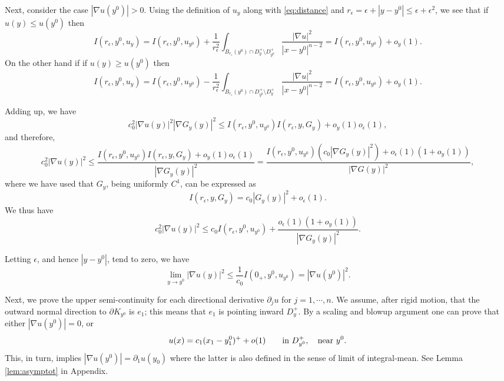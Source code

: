 \documentclass[11pt,reqno]{amsart}
\theoremstyle{plain}
\theoremstyle{remark}
\numberwithin{equation}{section}
\begin{document}
Next, consider the case \( |\nabla u(y^0)| > 0 \).
Using the definition of $u_y$ along with  \eqref{eq:distance} and  $r_\epsilon = \epsilon + |y-y^0| \leq  \epsilon + \epsilon^2$, we see that  
if $u(y) \leq u(y^0)$ then 
$$
I(r_\epsilon,y^0,u_{y}) = 
 I(r_\epsilon,y^0,u_{y^0}) + \frac{1}{r_\epsilon^2 }\int_{B_{r_\epsilon} (y^0) \cap D_{y}^+  \setminus D_{y^0}^+ }  \frac{|\nabla u|^2}{|x-y^0|^{n-2}} =  I(r_\epsilon,y^0,u_{y^0}) + o_y (1) .
$$
On the other hand if if $u(y) \geq u(y^0)$ then 
$$
I(r_\epsilon,y^0,u_{y}) = 
 I(r_\epsilon,y^0,u_{y^0}) - \frac{1}{r_\epsilon^2 }\int_{B_{r_\epsilon} (y^0) \cap D_{y^0}^+  \setminus D_{y}^+ }  \frac{|\nabla u|^2}{|x-y^0|^{n-2}} =  I(r_\epsilon,y^0,u_{y^0}) + o_y (1) .
$$





 Adding up, we have 
 $$
c_0^2|\nabla u (y) |^2|\nabla G_y (y) |^2 
\leq I(r_\epsilon,y^0,u_{y^0})  I(r_\epsilon,y,G_y) + o_y(1)o_\epsilon (1) ,
$$
and therefore,
$$c_0^2|\nabla u (y) |^2 \leq  \frac{I(r_\epsilon, y^0, u_{y^0}) I(r_\epsilon, y , G_{y} ) + o_y(1)o_\epsilon (1)  }{|\nabla G_y(y)|^2}
=   \frac{I(r_\epsilon, y^0, u_{y^0}) \left(c_0|\nabla G_{y} (y) |^2\right) + 
o_\epsilon (1) (1+   o_y(1))  }{|\nabla G(y)|^2},
$$
where we have used that  $G_y$, being  uniformly $C^1$,  can be expressed as 
$$
I(r_\epsilon, y , G_{y} ) = c_0|G_y(y)|^2 + o_{\epsilon}(1).
$$
We thus have 
$$c_0^2|\nabla u (y) |^2 \leq 
c_0I(r_\epsilon, y^0, u_{y^0})  + 
\frac{o_\epsilon (1) (1+   o_y(1))  }{|\nabla G_y(y)|^2}.
$$

Letting $\epsilon$, and hence $|y-y^0|$, tend to zero, we have 
$$
\lim_{y \to y^0}|\nabla u (y) |^2 \leq 
\frac{1}{c_0} I(0_+, y^0, u_{y^0})=|\nabla u (y^0)|^2.
$$

Next, we  prove the  upper semi-continuity for each directional derivative $\partial_ j u$ for $j=1, \cdots , n$.
We assume, after rigid motion, that   the outward normal direction to  $\partial K_{y^0}$ is $e_1$; this means that $e_1$ is pointing inward $D_y^+$.
By a scaling and blowup argument one can  prove that either $|\nabla u (y^0)| =0$, or   
\begin{equation}\label{eq:asymptotic}
    u(x) = c_1(x_1 -y_1^0)^+ + o(1) \qquad \hbox{in } D^+_{y^0} , \quad \hbox{near } y^0.
    \end{equation}
 This, in turn,  implies  $|\nabla u (y^0)|= \partial_1 u(y_0) $  where the latter is also defined in the sense of limit of  integral-mean. 
See   Lemma \ref{lem:asymptot} in  Appendix.
\end{document}
